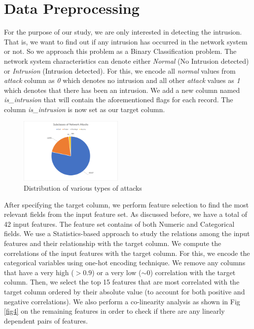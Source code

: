 \documentclass[conference]{IEEEtran}
\begin{document}
\section{Data Preprocessing}
For the purpose of our study, we are only interested in detecting the intrusion. That is, we want to find out if any intrusion has occurred in the network system or not. So we approach this problem as a Binary Classification problem. The network system characteristics can denote either \emph{Normal} (No Intrusion detected) or \emph{Intrusion} (Intrusion detected). For this, we encode all \emph{normal} values from \emph{attack} column as \emph{0} which denotes no intrusion and all other \emph{attack} values as \emph{1} which denotes that there has been an intrusion. We add a new column named \emph{is\_intrusion} that will contain the aforementioned flags for each record. The column \emph{is\_intrusion} is now set as our target column.

\begin{figure}[hbt!]
\centerline{\includegraphics[height= 160 pt, width=0.45\textwidth]{External/Fig-Subclasses-of-Attacks.PNG}}
\caption{Distribution of various types of attacks}
\label{fig3}
\end{figure}

After specifying the target column, we perform feature selection to find the most relevant fields from the input feature set. As discussed before, we have a total of 42 input features. The feature set contains of both Numeric and Categorical fields. We use a Statistics-based approach to study the relations among the input features and their relationship with the target column. We compute the correlations of the input features with the target column. For this, we encode the categorical variables using one-hot encoding technique. We remove any columns that have a very high ($>0.9$) or a very low ($\sim 0$) correlation with the target column. Then, we select the top 15 features that are most correlated with the target column ordered by their absolute value (to account for both positive and negative correlations). We also perform a co-linearity analysis as shown in Fig \ref{fig4} on the remaining features in order to check if there are any linearly dependent pairs of features.
\end{document}

